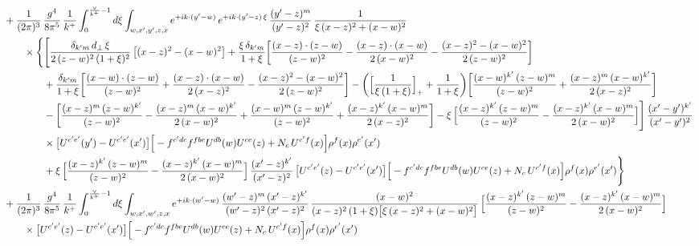 \documentclass[10pt]{article}
\numberwithin{equation}{section}
\begin{document}
\begin{align}
&+\frac{1}{(2\pi)^{3}}\,\frac{g^{4}}{8\pi^{5}}\,\frac{1}{k^{+}}\int_{0}^{\frac{\vee}{k^{+}}-1}d\xi\int_{w,x^{\prime},y^{\prime},z,x}e^{+ik\cdot (y^{\prime}-w)}\,e^{+ik\cdot (y^{\prime}-z)\,\xi}\,\frac{(y^{\prime}-z)^{m}}{(y^{\prime}-z)^{2}}\,\frac{1}{\xi\,(x-z)^{2}+(x-w)^{2}}\notag\\
&\qquad\times\Bigg\{\Bigg[\frac{\delta_{k^{\prime}m}\,d_{\perp}\,\xi}{2\,(z-w)^{2}\,(1+\xi)^{2}}\left[(x-z)^{2}-(x-w)^{2}\right]+\frac{\xi\,\delta_{k^{\prime}m}}{1+\xi}\bigg[\frac{(x-z)\cdot(z-w)}{(z-w)^{2}}-\frac{(x-z)\cdot(x-w)}{2\,(x-w)^{2}}-\frac{(x-z)^{2}-(x-w)^{2}}{2\,(z-w)^{2}}\bigg]\notag\\
&\qquad\qquad+\frac{\delta_{k^{\prime}m}}{1+\xi}\bigg[\frac{(x-w)\cdot(z-w)}{(z-w)^{2}}+\frac{(x-z)\cdot(x-w)}{2\,(x-z)^{2}}-\frac{(x-z)^{2}-(x-w)^{2}}{2\,(z-w)^{2}}\bigg]
-\bigg(\Big[\frac{1}{\xi\,(1+\xi)}\Big]_{+}+\frac{1}{1+\xi}\bigg)\bigg[\frac{(x-w)^{k^{\prime}}\,(z-w)^{m}}{(z-w)^{2}}+\frac{(x-z)^{m}\,(x-w)^{k^{\prime}}}{2\,(x-z)^{2}}\bigg]\notag\\
&\qquad\qquad-\bigg[\frac{(x-z)^{m}\,(z-w)^{k^{\prime}}}{(z-w)^{2}}-\frac{(x-z)^{m}\,(x-w)^{k^{\prime}}}{2\,(x-w)^{2}}+\frac{(x-w)^{m}\,(z-w)^{k^{\prime}}}{(z-w)^{2}}+\frac{(x-z)^{k^{\prime}}\,(x-w)^{m}}{2\,(x-z)^{2}}\bigg]
-\xi\,\Big[\frac{(x-z)^{k^{\prime}}\,(z-w)^{m}}{(z-w)^{2}}-\frac{(x-z)^{k^{\prime}}\,(x-w)^{m}}{2\,(x-w)^{2}}\Big]\Bigg]\,\frac{(x^{\prime}-y^{\prime})^{k^{\prime}}}{(x^{\prime}-y^{\prime})^{2}}\notag\\
&\qquad\qquad\times\big[U^{c^{\prime}e^{\prime}}(y^{\prime})-U^{c^{\prime}e^{\prime}}(x^{\prime})\big]\Big[-f^{c^{\prime}dc}f^{fbe}U^{db}(w)U^{ce}(z)+N_{c}\,U^{c^{\prime}f}(x)\Big]\rho^{f}(x)\rho^{e^{\prime}}(x^{\prime})\notag\\
&\qquad\qquad+\xi\,\Big[\frac{(x-z)^{k^{\prime}}\,(z-w)^{m}}{(z-w)^{2}}-\frac{(x-z)^{k^{\prime}}\,(x-w)^{m}}{2\,(x-w)^{2}}\Big]\,\frac{(x^{\prime}-z)^{k^{\prime}}}{(x^{\prime}-z)^{2}}\,\big[U^{c^{\prime}e^{\prime}}(z)-U^{c^{\prime}e^{\prime}}(x^{\prime})\big]\Big[-f^{c^{\prime}dc}f^{fbe}U^{db}(w)U^{ce}(z)+N_{c}\,U^{c^{\prime}f}(x)\Big]\rho^{f}(x)\rho^{e^{\prime}}(x^{\prime})\Bigg\}\notag\\
&+\frac{1}{(2\pi)^{3}}\,\frac{g^{4}}{8\pi^{5}}\,\frac{1}{k^{+}}\int_{0}^{\frac{\vee}{k^{+}}-1}d\xi\int_{w,x^{\prime},w^{\prime},z,x}e^{+ik\cdot (w^{\prime}-w)}\,\frac{(w^{\prime}-z)^{m}\,(x^{\prime}-z)^{k^{\prime}}}{(w^{\prime}-z)^{2}\,(x^{\prime}-z)^{2}}\,\frac{(x-w)^{2}}{(x-z)^{2}\,(1+\xi)\big[\xi\,(x-z)^{2}+(x-w)^{2}\big]}\,\Big[\frac{(x-z)^{k^{\prime}}\,(z-w)^{m}}{(z-w)^{2}}-\frac{(x-z)^{k^{\prime}}\,(x-w)^{m}}{2\,(x-w)^{2}}\Big]\notag\\&\qquad\times\big[U^{c^{\prime}e^{\prime}}(z)-U^{c^{\prime}e^{\prime}}(x^{\prime})\big]\Big[-f^{c^{\prime}dc}f^{fbe}U^{db}(w)U^{ce}(z)+N_{c}\,U^{c^{\prime}f}(x)\Big]\rho^{f}(x)\rho^{e^{\prime}}(x^{\prime})\notag\\[6pt]

\end{align}
\end{document}
